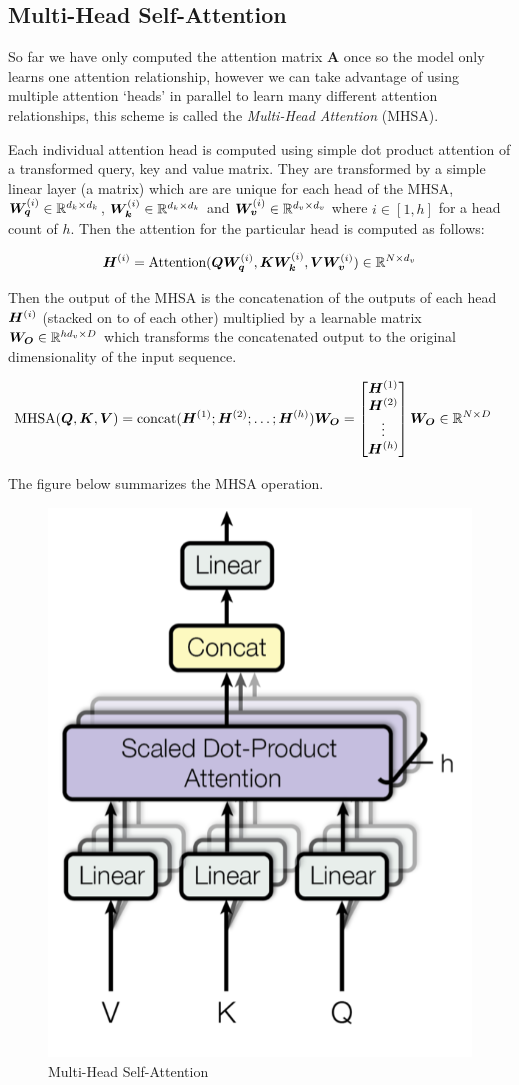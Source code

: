 \documentclass[../main.tex]{subfiles}
\begin{document}
\subsection{Multi-Head Self-Attention}

So far we have only computed the attention matrix $\bm{A}$ once so the model only learns one attention relationship, however we can take advantage of using multiple attention `heads' in parallel to learn many different attention relationships, this scheme is called the \emph{Multi-Head Attention} (MHSA). 

Each individual attention head is computed using simple dot product attention of a transformed query, key and value matrix. They are transformed by a simple linear layer (a matrix) which are are unique for each head of the MHSA, $\bm{W_q}^{(i)} \in \mathbb{R}^{d_k \times d_k}$, $\bm{W_k}^{(i)} \in \mathbb{R}^{d_k \times d_k}$ and $\bm{W_v}^{(i)} \in \mathbb{R}^{d_v \times d_v}$ where $i \in [1, h]$ for a head count of $h$. Then the attention for the particular head is computed as follows:

\begin{equation}
	\bm{H}^{(i)} = \text{Attention}(\bm{Q}\bm{W_q}^{(i)}, \bm{K}\bm{W_k}^{(i)}, \bm{V}\bm{W_v}^{(i)}) \in \mathbb{R}^{N \times d_v}
\end{equation}

Then the output of the MHSA is the concatenation of the outputs of each head $\bm{H}^{(i)}$ (stacked on to of each other) multiplied by a learnable matrix $\bm{W_O} \in \mathbb{R}^{hd_v \times D}$ which transforms the concatenated output to the original dimensionality of the input sequence.

\begin{align*}
	 \text{MHSA}(\bm{Q}, \bm{K}, \bm{V}) &= \text{concat}(\bm{H}^{(1)}; \bm{H}^{(2)}; \dots; \bm{H}^{(h)})\bm{W_O} 
	= \begin{bmatrix}
		\bm{H}^{(1)} \\
		\bm{H}^{(2)} \\
		\vdots \\
		\bm{H}^{(h)}
	\end{bmatrix} \bm{W_O} \in \mathbb{R}^{N \times D}
\end{align*}

The figure below summarizes the MHSA operation.

\begin{figure}[H]
	\centering
	\includegraphics[height=0.4\textwidth]{./figures/transformer/mhsa.png}
	\caption{Multi-Head Self-Attention \cite{vaswani2017attention}}
\end{figure}
\end{document}

